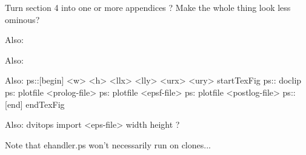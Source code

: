 Turn section 4 into one or more appendices ? 
Make the whole thing look less ominous?

Also:  

Also:  

Also:  	ps::[begin] <w> <h> <llx> <lly> <urx> <ury> startTexFig
	ps:: doclip
	ps: plotfile <prolog-file>
	ps: plotfile <epsf-file>
	ps: plotfile <postlog-file>
	ps::[end] endTexFig

Also:  dvitops import <eps-file> width height ?

Note that ehandler.ps won't necessarily run on clones...










